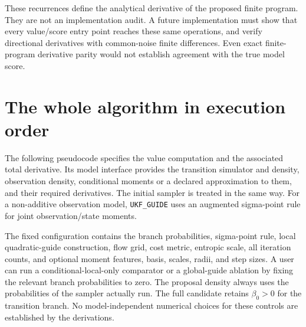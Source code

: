 \documentclass[11pt,a4paper]{article}
\begin{document}
These recurrences define the analytical derivative of the proposed
finite program. They are not an implementation audit. A future implementation
must show that every value/score entry point reaches these same operations,
and verify directional derivatives with common-noise finite differences.
Even exact finite-program derivative parity would not establish agreement
with the true model score.


\section{The whole algorithm in execution order}

The following pseudocode specifies the value computation and the associated
total derivative. Its model interface provides the transition simulator and
density, observation density, conditional moments or a declared approximation
to them, and their required derivatives. The initial sampler is treated in
the same way. For a non-additive observation model, \texttt{UKF\_GUIDE}
uses an augmented sigma-point rule for joint observation/state moments.

The fixed configuration contains the branch probabilities, sigma-point rule,
local quadratic-guide construction, flow grid, cost metric, entropic scale,
all iteration counts, and optional moment features, basis, scales, radii,
and step sizes. A user can run a conditional-local-only comparator or a
global-guide ablation by fixing the relevant branch probabilities to zero.
The proposal density always uses the probabilities of the sampler actually
run. The full candidate retains \(\beta_0>0\) for the transition branch.
No model-independent numerical choices for these controls are established
by the derivations.
\end{document}
